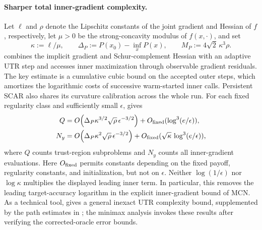 \documentclass{article}
\begin{document}
\paragraph{Sharper total inner-gradient complexity.}
Let $\ell$ and $\rho$ denote the Lipschitz constants of the joint
gradient and Hessian of $f$, respectively, let $\mu>0$ be the
strong-concavity modulus of $f(x,\cdot)$, and set
\[
 \kappa:=\ell/\mu,\qquad
 \Delta_P:=P(x_0)-\inf_xP(x),\qquad
 M_P:=4\sqrt2\,\kappa^3\rho.
\]
 combines the implicit gradient and
Schur-complement Hessian with an adaptive UTR step and accesses inner
maximization through observable gradient residuals.
The key estimate is a cumulative cubic bound on the accepted outer
steps, which amortizes the logarithmic costs of successive
warm-started inner calls. Persistent SCAR also shares its curvature
calibration across the whole run.
For each fixed regularity class and sufficiently small $\epsilon$,
 gives
\begin{align*}
 Q&=O\!\left(\Delta_P\kappa^{3/2}\sqrt\rho\,
                   \epsilon^{-3/2}\right)
       +O_{\rm fixed}(\log^3(e/\epsilon)),\\
 N_y&=O\!\left(\Delta_P\kappa^2\sqrt\rho\,
                   \epsilon^{-3/2}\right)
       +O_{\rm fixed}(\sqrt\kappa\,\log^3(e/\epsilon)),
\end{align*}
where $Q$ counts trust-region subproblems and $N_y$ counts all
inner-gradient evaluations. Here $O_{\rm fixed}$ permits constants
depending on the fixed payoff, regularity constants, and
initialization, but not on $\epsilon$.
Neither $\log(1/\epsilon)$ nor $\log\kappa$ multiplies the displayed
leading inner term. In particular, this removes the leading
target-accuracy logarithm in the explicit inner-gradient bound of
MCN. As a technical tool,  gives a general
inexact UTR complexity bound, supplemented by the path estimates in
; the minimax analysis invokes these results
after verifying the corrected-oracle error bounds.
\end{document}

